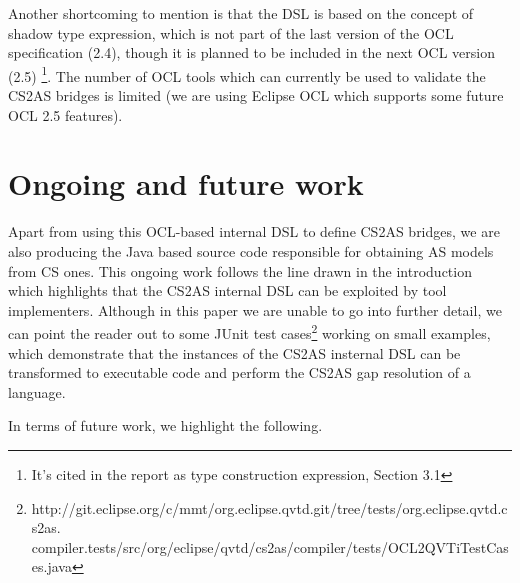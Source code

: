 \documentclass{llncs}
\begin{document}
Another shortcoming to mention is that the DSL is based on the concept of shadow type expression, which is not part of the last version of the OCL specification (2.4), though it is planned to be included in the next OCL version (2.5) \cite{brucker2013aachenReport}\footnote{It's cited in the report as type construction expression, Section 3.1}. The number of OCL tools which can currently be used to validate the CS2AS bridges is limited (we are using Eclipse OCL\cite{eclipseOclOnline} which supports some future OCL 2.5 features).

\section{Ongoing and future work}
\label{sec:futureWork}

Apart from using this OCL-based internal DSL to define CS2AS bridges, we are also producing the Java based source code responsible for obtaining AS models from CS ones. This ongoing work follows  the line drawn in the introduction which highlights that the CS2AS internal DSL can be exploited by tool implementers. Although in this paper we are unable to go into further detail, we can point the reader out to some JUnit test cases\footnote{http://git.eclipse.org/c/mmt/org.eclipse.qvtd.git/tree/tests/org.eclipse.qvtd.cs2as.
compiler.tests/src/org/eclipse/qvtd/cs2as/compiler/tests/OCL2QVTiTestCases.java} working on small examples, which demonstrate that the instances of the CS2AS insternal DSL can be transformed to executable code and perform the CS2AS gap resolution of a language.

In terms of future work, we highlight the following.
\end{document}
